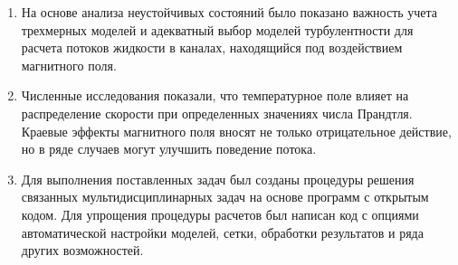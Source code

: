 \begin{enumerate}
  \item На основе анализа неустойчивых состояний было показано важность учета трехмерных моделей и адекватный выбор моделей турбулентности для расчета потоков жидкости в каналах, находящийся под воздействием магнитного поля. 
  \item Численные исследования показали, что температурное поле влияет на распределение скорости при определенных значениях числа Прандтля. Краевые эффекты магнитного поля вносят не только отрицательное действие, но в ряде случаев могут улучшить поведение потока. 
  \item Для выполнения поставленных задач был созданы процедуры решения связанных мультидисциплинарных задач на основе программ с открытым кодом. Для упрощения процедуры расчетов был написан код с опциями автоматической настройки моделей, сетки, обработки результатов и ряда других возможностей. 
\end{enumerate}
